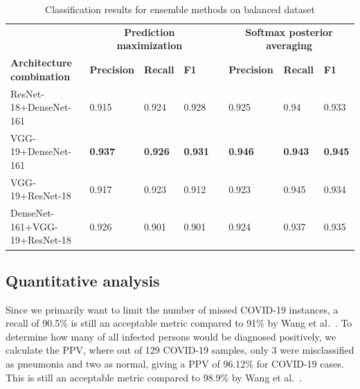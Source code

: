 \documentclass[conference]{IEEEtran}
\begin{document}
\begin{table}
    \centering
    \caption{Classification results for ensemble methods on balanced dataset}
	\label{Table:ensemble_result}
	\scriptsize{
	\begin{tabular}{p{4.3cm}p{1.6cm}p{1.1cm}p{0.8cm}p{0.1cm}p{1.6cm}p{1.1cm}p{0.8cm}}
		 &  \multicolumn{3}{c}{\textbf{Prediction maximization}} && \multicolumn{3}{c}{\textbf{Softmax posterior averaging}}  \\	
		\cmidrule{2-4}\cmidrule{6-8}
		\textbf{Architecture combination} &  \textbf{Precision} & \textbf{Recall}& \textbf{F1}&& \textbf{Precision} & \textbf{Recall}& \textbf{F1}\\
		\hline
		ResNet-18+DenseNet-161 & 0.915 & 0.924 & 0.928 && 0.925 & 0.94 & 0.933\\
		VGG-19+DenseNet-161 & \textbf{0.937} & \textbf{0.926} & \textbf{0.931} && \textbf{0.946} & \textbf{0.943} & \textbf{0.945}\\
		VGG-19+ResNet-18 & 0.917 & 0.923 & 0.912 &&  0.923 & 0.945 & 0.934\\
		DenseNet-161+VGG-19+ResNet-18 & 0.926 & 0.901 & 0.901 && 0.924 & 0.937 & 0.935\\
		\hline 
	\end{tabular}}
	\vspace{-2mm}
\end{table}

\subsection{Quantitative analysis}
Since we primarily want to limit the number of missed COVID-19 instances, a recall of 90.5\% is still an acceptable metric compared to 91\% by Wang et al.~\cite{wang2020covid}.
To determine how many of all infected persons would be diagnosed positively, we calculate the PPV, where out of 129 COVID-19 samples, only 3 were misclassified as pneumonia and two as normal, giving a PPV of 96.12\% for COVID-19 cases. This is still an acceptable metric compared to 98.9\% by Wang et al.~\cite{wang2020covid}. 
\end{document}
